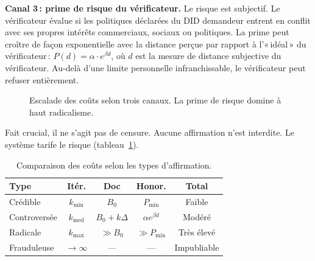 \documentclass[11pt,a4paper,twocolumn]{article}
\begin{document}
\textbf{Canal 3\,: prime de risque du vérificateur.} Le risque est subjectif. Le vérificateur évalue si les politiques déclarées du DID demandeur entrent en conflit avec ses propres intérêts commerciaux, sociaux ou politiques. La prime peut croître de façon exponentielle avec la distance perçue par rapport à l'«\,idéal\,» du vérificateur\,: $P(d) = \alpha \cdot e^{\beta d}$, où $d$ est la mesure de distance subjective du vérificateur. Au-delà d'une limite personnelle infranchissable, le vérificateur peut refuser entièrement.

\begin{figure}[ht]
\centering
{}
\caption{Escalade des coûts selon trois canaux. La prime de risque domine à haut radicalisme.}
\label{fig:radicalism}
\end{figure}

Fait crucial, il ne s'agit pas de censure. Aucune affirmation n'est interdite. Le système tarife le risque (tableau~\ref{tab:costs}).

\begin{table}[ht]
\centering
\caption{Comparaison des coûts selon les types d'affirmation.}
\label{tab:costs}
\footnotesize
\begin{tabular}{@{}lcccc@{}}
\toprule
\textbf{Type} & \textbf{Itér.} & \textbf{Doc} & \textbf{Honor.} & \textbf{Total} \\
\midrule
Crédible & $k_{\min}$ & $B_0$ & $P_{\min}$ & Faible \\
Controversée & $k_{\text{med}}$ & $B_0{+}k\Delta$ & $\alpha e^{\beta d}$ & Modéré \\
Radicale & $k_{\max}$ & $\gg B_0$ & $\gg P_{\min}$ & Très élevé \\
Frauduleuse & $\to\infty$ & --- & --- & Impubliable \\
\bottomrule
\end{tabular}
\end{table}
\end{document}
